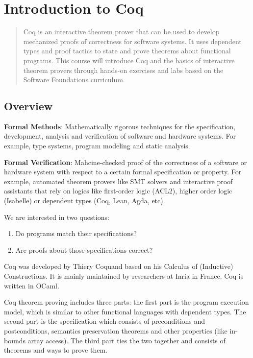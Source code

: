 \section{Introduction to Coq}
\begin{abstract}
	Coq is an interactive theorem prover that can be used to develop mechanized proofs of correctness for software systems. It uses dependent types and proof tactics to state and prove theorems about functional programs. This course will introduce Coq and the basics of interactive theorem provers through hands-on exercises and labs based on the Software Foundations curriculum.
\end{abstract}

\subsection{Overview}
\textbf{Formal Methods}: Mathematically rigorous techniques for the specification, development, analysis and verification
of software and hardware systems. For example, type systems, program modeling and static analysis.

\textbf{Formal Verification}: Mahcine-checked proof of the correctness of a software or hardware system with respect
to a certain formal specification or property. For example, automated theorem provers like SMT solvers and interactive
proof assistants that rely on logics like first-order logic (ACL2), higher order logic (Isabelle) or dependent types (Coq, Lean, Agda, etc).

We are interested in two questions: 
\begin{enumerate}
\item Do programs match their specifications?
\item Are proofs about those specifications correct?
\end{enumerate}

Coq was developed by Thiery Coquand based on his Calculus of (Inductive) Constructions. It is mainly maintained by researchers at Inria in
France. Coq is written in OCaml.

Coq theorem proving includes three parts: the first part is the program execution model, which is similar to other functional languages
with dependent types. The second part is the specification which consists of preconditions and postconditions, semantics preservation theorems
and other properties (like in-bounds array access). The third part ties the two together and consists of theorems and ways to prove them.

